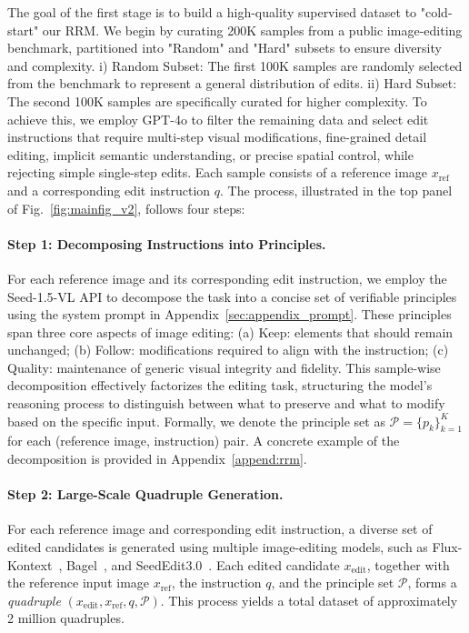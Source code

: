 The goal of the first stage is to build a high-quality supervised dataset to "cold-start" our RRM. We begin by curating 200K samples from a public image-editing benchmark, partitioned into "Random" and "Hard" subsets to ensure diversity and complexity. 
i) Random Subset: The first 100K samples are randomly selected from the benchmark to represent a general distribution of edits. 
ii) Hard Subset: The second 100K samples are specifically curated for higher complexity. To achieve this, we employ GPT-4o to filter the remaining data and select edit instructions that require multi-step visual modifications, fine-grained detail editing, implicit semantic understanding, or precise spatial control, while rejecting simple single-step edits.
Each sample consists of a reference image $x_{\mathrm{ref}}$ and a corresponding edit instruction $q$.
The process, illustrated in the top panel of Fig.~\ref{fig:mainfig_v2}, follows four steps:
\vspace{-1.0em}
\paragraph{Step 1: Decomposing Instructions into Principles.}
For each reference image and its corresponding edit instruction, we employ the Seed-1.5-VL API to decompose the task into a concise set of verifiable principles using the system prompt in Appendix~\ref{sec:appendix_prompt}. These principles span three core aspects of image editing:
(a) Keep: elements that should remain unchanged;
(b) Follow: modifications required to align with the instruction;
(c) Quality: maintenance of generic visual integrity and fidelity.
This sample-wise decomposition effectively factorizes the editing task, structuring the model's reasoning process to distinguish between what to preserve and what to modify based on the specific input.
Formally, we denote the principle set as $\mathcal{P}=\{p_k\}_{k=1}^{K}$ for each (reference image, instruction) pair.
A concrete example of the decomposition is provided in Appendix~\ref{append:rrm}.
\vspace{-1.0em}
\paragraph{Step 2: Large-Scale Quadruple Generation.}
For each reference image and corresponding edit instruction, a diverse set of edited candidates is generated using multiple image-editing models, such as Flux-Kontext~\citep{blackforestlabs_flux}, Bagel~\citep{deng2025emerging}, and SeedEdit3.0~\citep{wang2025seededit}. Each edited candidate $x_{\mathrm{edit}}$, together with the reference input image $x_{\mathrm{ref}}$, the instruction $q$, and the principle set $\mathcal{P}$, forms a \emph{quadruple} $(x_{\mathrm{edit}}, x_{\mathrm{ref}}, q, \mathcal{P})$. This process yields a total dataset of approximately 2 million quadruples.

